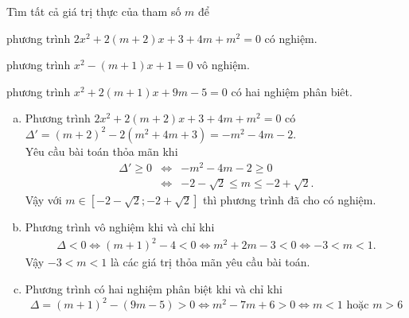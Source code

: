 \begin{baitap}%
	Tìm tất cả giá trị thực của tham số $m$ để
	\begin{enumEX}[a)]{1}
		\item phương trình $2x^2+2\left( m+2 \right)x+3+4m+{m^2}=0$ có nghiệm.
		\item phương trình $x^2-(m+1)x+1=0$ vô nghiệm.
		\item phương trình $x^2+2(m+1)x+9m-5=0$ có hai nghiệm phân biêt.
	\end{enumEX}
	\loigiai
	{
		\begin{enumerate}[a)]
			\item Phương trình $2x^2+2(m+2)x+3+4m+m^2=0$ có $\Delta'=(m+2)^2-2(m^2+4m+3) = -m^2-4m-2$.\\
			Yêu cầu bài toán thỏa mãn khi
			\allowdisplaybreaks
			\begin{eqnarray*}
				\Delta' \geq 0 &\Leftrightarrow & -m^2-4m-2 \geq 0\\
				&\Leftrightarrow & -2-\sqrt{2} \leq m \leq -2+\sqrt{2}.
			\end{eqnarray*}
			Vậy với $m \in \left[-2-\sqrt{2};-2+\sqrt{2}\right]$ thì phương trình đã cho có nghiệm.
			\item Phương trình vô nghiệm khi và chỉ khi
			\begin{eqnarray*}
				\Delta <0 \Leftrightarrow (m+1)^2-4<0 \Leftrightarrow m^2+2m-3<0 \Leftrightarrow -3<m<1.
			\end{eqnarray*}
			Vậy $-3<m<1$ là các giá trị thỏa mãn yêu cầu bài toán.
			\item Phương trình có hai nghiệm phân biệt khi và chỉ khi
			$$\Delta=(m+1)^2-(9m-5)>0 \Leftrightarrow m^2-7m+6>0 \Leftrightarrow m<1 \text{ hoặc } m>6$$
			\end{enumerate}
		}
\end{baitap}


